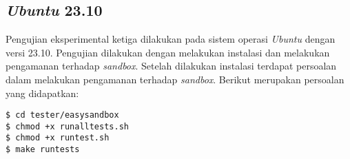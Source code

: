 \subsection{\textit{Ubuntu} 23.10}
Pengujian eksperimental ketiga dilakukan pada sistem operasi \textit{Ubuntu} dengan versi 23.10. Pengujian dilakukan dengan melakukan instalasi dan melakukan pengamanan terhadap \textit{sandbox}. Setelah dilakukan instalasi terdapat persoalan dalam melakukan pengamanan terhadap \textit{sandbox}. Berikut merupakan persoalan yang didapatkan:
\begin{lstlisting}[caption=Pembangunan \textit{sandbox} pada \textit{Ubuntu} 23.10, label=kode:sandbox2310]
$ cd tester/easysandbox
$ chmod +x runalltests.sh
$ chmod +x runtest.sh
$ make runtests
\end{lstlisting}

